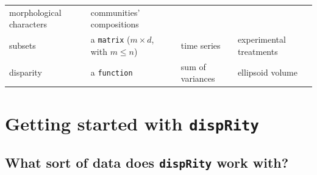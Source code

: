 \documentclass[]{book}
\begin{document}
\begin{longtable}[]{@{}llll@{}}
\begin{minipage}[t]{0.26\columnwidth}
morphological characters\strut
\end{minipage} & \begin{minipage}[t]{0.19\columnwidth}\raggedright
communities' compositions\strut
\end{minipage}\tabularnewline
\begin{minipage}[t]{0.22\columnwidth}\raggedright
subsets\strut
\end{minipage} & \begin{minipage}[t]{0.22\columnwidth}\raggedright
a \texttt{matrix} (\(m \times d\), with \(m \leq n\))\strut
\end{minipage} & \begin{minipage}[t]{0.26\columnwidth}\raggedright
time series\strut
\end{minipage} & \begin{minipage}[t]{0.19\columnwidth}\raggedright
experimental treatments\strut
\end{minipage}\tabularnewline
\begin{minipage}[t]{0.22\columnwidth}\raggedright
disparity\strut
\end{minipage} & \begin{minipage}[t]{0.22\columnwidth}\raggedright
a \texttt{function}\strut
\end{minipage} & \begin{minipage}[t]{0.26\columnwidth}\raggedright
sum of variances\strut
\end{minipage} & \begin{minipage}[t]{0.19\columnwidth}\raggedright
ellipsoid volume\strut
\end{minipage}\tabularnewline
\bottomrule
\end{longtable}

\hypertarget{getting-started-with-disprity}{%
\chapter{\texorpdfstring{Getting started with \texttt{dispRity}}{Getting started with dispRity}}\label{getting-started-with-disprity}}

\hypertarget{what-sort-of-data-does-disprity-work-with}{%
\section{\texorpdfstring{What sort of data does \texttt{dispRity} work with?}{What sort of data does dispRity work with?}}\label{what-sort-of-data-does-disprity-work-with}}
\end{document}
